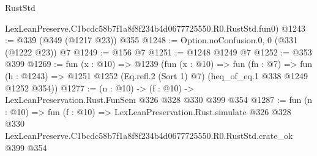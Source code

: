 \begin{lexlean}{RustStd}
\begin{coremodule}
    LexLeanPreserve.C1bcdc58b7f1a8f8f234b4d0677725550.R0.RustStd.fun0)
@1243 := @339 (@349 (@1217 @23)) @355
@1248 := Option.noConfusion.{0, 0} (@331 (@1222 @23)) @7
@1249 := @156 @7
@1251 := @1248 @1249 @7
@1252 := @353 @399
@1269 := fun (x : @10) =>
  @1239
    (fun (x : @10) =>
    fun (fn : @7) =>
    fun (h : @1243) => @1251 @1252 (Eq.refl.{2} (Sort 1) @7) (heq_of_eq.{1} @338 @1249 @1252 @354))
@1277 := (n : @10) -> (f : @10) -> LexLeanPreservation.Rust.FunSem @326 @328 @330 @399 @354
@1287 := fun (n : @10) =>
  fun (f : @10) =>
  LexLeanPreservation.Rust.simulate
    @326
    @328
    @330
    LexLeanPreserve.C1bcdc58b7f1a8f8f234b4d0677725550.R0.RustStd.crate_ok
    @399
    @354
\end{coremodule}
\end{lexlean}

